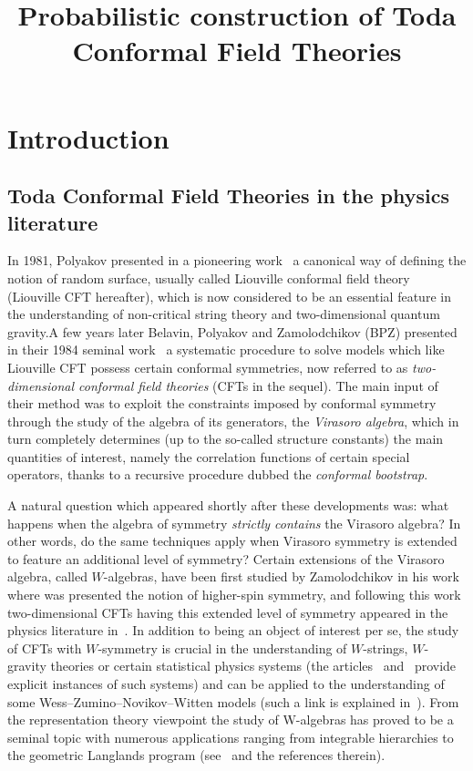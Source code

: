 \documentclass[AHL,Unicode,longabstracts,published]{cedram}
\title[Toda Conformal Field Theories]{Probabilistic construction of Toda Conformal Field Theories}
\author[\initial{B.} \lastname{Cerclé}]{\firstname{Baptiste} \lastname{Cerclé}}
\author[\initial{R.} \lastname{Rhodes}]{\firstname{Rémi} \lastname{Rhodes}}
\author[\initial{V.} \lastname{Vargas}]{\firstname{Vincent} \lastname{Vargas}}
\begin{document}
\maketitle

\section{Introduction}


\subsection{Toda Conformal Field Theories in the physics literature}

In 1981, Polyakov presented in a pioneering work~\cite{Pol81} a canonical way of defining the notion of random surface, usually called Liouville conformal field theory (Liouville CFT hereafter), which is now considered to be an essential feature in the understanding of non-critical string theory and two-dimensional quantum gravity.\linebreak A few years later Belavin, Polyakov and Zamolodchikov (BPZ) presented in their 1984 seminal work~\cite{BPZ} a systematic procedure to solve models which like Liouville CFT possess certain conformal symmetries, now referred to as \emph{two-dimensional conformal field theories} (CFTs in the sequel). The main input of their method was to exploit the constraints imposed by conformal symmetry through the study of the algebra of its generators, the \emph{Virasoro algebra}, which in turn completely determines (up to the so-called structure constants) the main quantities of interest, namely the correlation functions of certain special operators, thanks to a recursive procedure dubbed the \emph{conformal bootstrap}.

A natural question which appeared shortly after these developments was: what happens when the algebra of symmetry \emph{strictly contains} the Virasoro algebra? In other words, do the same techniques apply when Virasoro symmetry is extended to feature an additional level of symmetry? Certain extensions of the Virasoro algebra, called $W$-algebras, have been first studied by Zamolodchikov in his work~\cite{Za85} where was presented the notion of higher-spin symmetry, and following this work two-dimensional CFTs having this extended level of symmetry appeared in the physics literature in~\cite{FaLu,FaZa}. In addition to being an object of interest per se, the study of CFTs with $W$-symmetry is crucial in the understanding of $W$-strings, $W$-gravity theories or certain statistical physics systems (the articles~\cite{FaZa2} and~\cite{JMO} provide explicit instances of such systems) and can be applied to the understanding of some Wess--Zumino--Novikov--Witten models (such a link is explained in~\cite{FORTW}). From the representation theory viewpoint the study of W-algebras has proved to be a seminal topic with numerous applications ranging from integrable hierarchies to the geometric Langlands program (see~\cite{Arakawa_intro} and the references therein).
\end{document}
